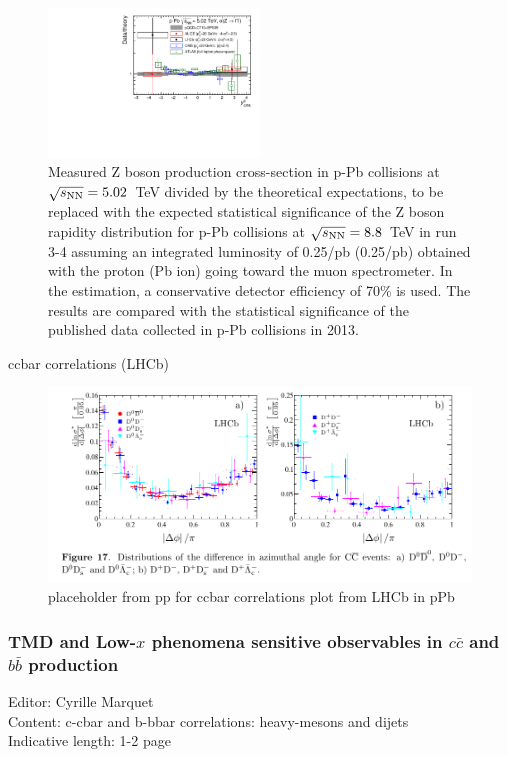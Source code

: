 \documentclass[../report.tex]{subfiles}
\begin{document}
\begin{figure}[htb]
\centering
\includegraphics[width=0.5\textwidth]{figs/placeholder_z_pPb_ALICE.pdf}
\caption{Measured Z boson production cross-section in p-Pb collisions at $\sqrt{s_{\rm NN}} = 5.02$~TeV divided by the theoretical expectations, to be replaced with the expected statistical significance of the Z boson rapidity distribution for p-Pb collisions at $\sqrt{s_{\rm NN}} = 8.8$~TeV in run 3-4 assuming an integrated luminosity of 0.25/pb (0.25/pb) obtained with the proton (Pb ion) going toward the muon spectrometer. In the estimation, a conservative detector efficiency of 70\% is used. The results are compared with the statistical significance of the published data collected in p-Pb collisions in 2013.}
\end{figure}



 ccbar correlations (LHCb)
\begin{figure}
\includegraphics[width=1.0\textwidth]{figs/placeholderppmeas.png}
\caption{placeholder from pp for ccbar correlations plot from LHCb in pPb}
\end{figure}

\subsubsection{TMD and Low-$x$ phenomena sensitive observables in $c\bar{c}$ and $b\bar{b}$ production }
Editor:  Cyrille Marquet\\
Content: c-cbar and b-bbar correlations: heavy-mesons and dijets \\
Indicative length: 1-2 page
\end{document}
